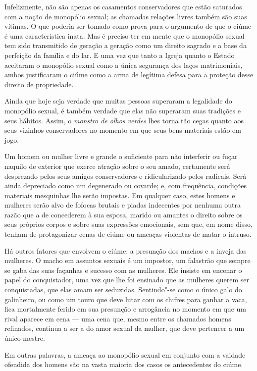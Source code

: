 Infelizmente, não são apenas os casamentos conservadores que estão
saturados com a noção de monopólio sexual; as chamadas relações livres
também são suas vítimas. O que poderia ser tomado como prova para o argumento de que o ciúme é uma característica inata. Mas é
preciso ter em mente que o monopólio sexual tem sido transmitido de
geração a geração como um direito sagrado e a base da perfeição da
família e do lar. E uma vez que tanto a Igreja quanto o Estado
aceitaram o monopólio sexual como a única segurança dos laços
matrimoniais, ambos justificaram o ciúme como a arma de legítima defesa
para a proteção desse direito de propriedade.

Ainda que hoje seja verdade que muitas pessoas superaram a legalidade do
monopólio sexual, é também verdade que elas não superaram suas tradições
e seus hábitos. Assim, o \textit{monstro de olhos verdes} lhes torna tão
cegas quanto aos seus vizinhos conservadores no momento em que seus bens
materiais estão em jogo.

Um homem ou mulher livre e grande o suficiente para não interferir ou
fuçar naquilo de exterior que exerce atração sobre o seu amado,
certamente será desprezado pelos seus amigos conservadores e
ridicularizado pelos radicais. Será ainda depreciado como um degenerado
ou covarde; e, com frequência, condições materiais mesquinhas lhe serão
impostas. Em qualquer caso, estes homens e mulheres serão alvo de
fofocas brutais e piadas indecentes por nenhuma outra razão que a de
concederem à sua esposa, marido ou amantes o direito sobre os seus
próprios corpos e sobre suas expressões emocionais, sem que, em nome
disso, tenham de protagonizar cenas de ciúme ou ameaças violentas de
matar o intruso.

Há outros fatores que envolvem o ciúme: a presunção dos machos e a
inveja das mulheres. O macho em assuntos sexuais é um impostor, um
falastrão que sempre se gaba das suas façanhas e sucesso com as
mulheres. Ele insiste em encenar o papel do conquistador, uma vez que
lhe foi ensinado que as mulheres querem ser conquistadas, que elas amam
ser seduzidas. Sentindo"-se como o único galo do galinheiro, ou como um
touro que deve lutar com os chifres para ganhar a vaca, fica mortalmente
ferido em sua presunção e arrogância no momento em que um rival aparece
em cena --- uma cena que, mesmo entre os chamados homens refinados,
continua a ser a do amor sexual da mulher, que deve pertencer a um único
mestre.

Em outras palavras, a ameaça ao monopólio sexual em conjunto com a
vaidade ofendida dos homens são na vasta maioria dos casos os
antecedentes do ciúme.

